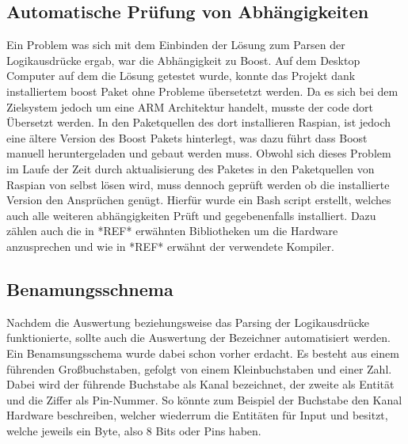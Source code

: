 \subsection{Automatische Prüfung von Abhängigkeiten}\label{kap:ums:abh}
Ein Problem was sich mit dem Einbinden der Lösung zum Parsen der Logikausdrücke ergab, war die Abhängigkeit zu Boost. Auf dem Desktop Computer auf dem die Lösung getestet wurde, konnte das Projekt dank installiertem boost Paket ohne Probleme übersetetzt werden. Da es sich bei dem  Zielsystem jedoch um eine ARM Architektur handelt, musste der code dort Übersetzt werden. In den Paketquellen des dort installieren Raspian, ist jedoch eine ältere Version des Boost Pakets hinterlegt, was dazu führt dass Boost manuell heruntergeladen und gebaut werden muss. Obwohl sich dieses Problem im Laufe der Zeit durch aktualisierung des Paketes in den Paketquellen von Raspian von selbst lösen wird, muss dennoch geprüft werden ob die installierte Version den Ansprüchen genügt. Hierfür wurde ein Bash script erstellt, welches auch alle weiteren abhängigkeiten Prüft und gegebenenfalls installiert. Dazu zählen auch die in *REF* erwähnten Bibliotheken um die Hardware anzusprechen und wie in *REF* erwähnt der verwendete Kompiler. 
 
\subsection{Benamungsschnema}\label{kap:ums:banamsung}
Nachdem die Auswertung beziehungsweise das Parsing der Logikausdrücke funktionierte, sollte auch die Auswertung der Bezeichner automatisiert werden. Ein Benamsungsschema wurde dabei schon vorher erdacht. Es besteht aus einem führenden Großbuchstaben, gefolgt von einem Kleinbuchstaben und einer Zahl. Dabei wird der führende Buchstabe als Kanal bezeichnet, der zweite als Entität und die Ziffer als Pin-Nummer. So könnte zum Beispiel der Buchstabe  den Kanal Hardware beschreiben, welcher  wiederrum die Entitäten  für Input und  besitzt, welche jeweils ein Byte, also 8 Bits oder Pins haben. 

